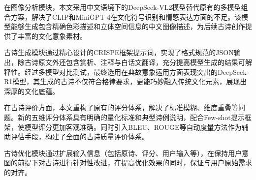 在图像分析模块，本文采用中文语境下的DeepSeek-VL2模型替代原有的多模型组合方案，解决了CLIP和MiniGPT-4在文化符号识别和情感表达方面的不足。该模型能够生成包含精确色彩描述和立体空间信息的中文图像描述，为后续古诗创作提供了丰富的文化意象素材。

古诗生成模块通过精心设计的CRISPE框架提示词，实现了格式规范的JSON输出，除古诗原文外还包含赏析、注释与白话文翻译，充分提高模型生成的结果可解释性。经过多模型对比测试，最终选用在典故意象运用方面表现突出的DeepSeek-R1模型，其生成的古诗不仅符合格律要求，更能巧妙融入传统文化元素，展现出深厚的文化底蕴。

在古诗评价方面，本文重构了原有的评分体系，解决了标准模糊、维度重叠等问题。新的五维评分体系具有明确的量化标准和典型诗例说明，配合Few-shot提示框架，使模型评分更加客观准确。同时引入BLEU、ROUGE等自动度量方法作为辅助评估手段，构建了全面的古诗质量评价体系。

古诗优化模块通过扩展输入信息（包括原诗、评分、用户输入等），在保持用户意图的前提下对古诗进行针对性改进，在提高优化效果的同时，保证与用户原始需求的对齐。
